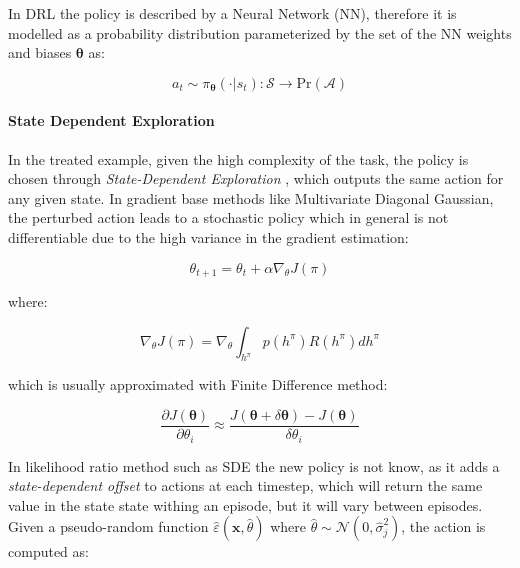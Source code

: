 In \ac{DRL} the policy is described by a Neural Network (\ac{NN}), therefore it is modelled as a probability distribution parameterized by the set of the \ac{NN} weights and biases $\boldsymbol{\theta}$ as:

\begin{equation}
    a _t \sim \pi _{\boldsymbol{\theta}}(\cdot | s_t): \mathcal{S} \rightarrow \mathrm{Pr}(\mathcal{A})
\end{equation}

\paragraph{State Dependent Exploration} In the treated example, given the high complexity of the task, the policy is chosen through \textit{State-Dependent Exploration} \cite{daelemans_state-dependent_2008} \cite{raffin_smooth_2021}, which outputs the same action for any given state. In gradient base methods like Multivariate Diagonal Gaussian, the perturbed action leads to a stochastic policy which in general is not differentiable due to the high variance in the gradient estimation:

\begin{equation}
    \theta _{t+1} = \theta _t + \alpha \nabla _{\theta} J(\pi)
\end{equation}

where:

\begin{equation}
    \nabla _{\theta} J(\pi) = \nabla _{\theta} \int _{h ^{\pi}} p(h ^{\pi})R(h ^{\pi})dh ^{\pi}
\end{equation}

which is usually approximated with Finite Difference method:

\begin{equation}
    \label{eqn:finitediff}
    \frac{\partial J(\boldsymbol{\theta})}{\partial \theta _i} \approx \frac{J(\boldsymbol{\theta} + \delta \boldsymbol{\theta}) - J(\boldsymbol{\theta})}{\delta \theta _i}
\end{equation}

In likelihood ratio method such as \ac{SDE} the new policy is not know, as it adds a \textit{state-dependent offset} to actions at each timestep, which will return the same value in the state state withing an episode, but it will vary between episodes. Given a pseudo-random function $\hat{\varepsilon}(\mathbf{x}, \hat{\theta})$ where $\hat{\theta} \sim \mathcal{N}(0, \hat{\sigma} _j ^2)$, the action is computed as:

